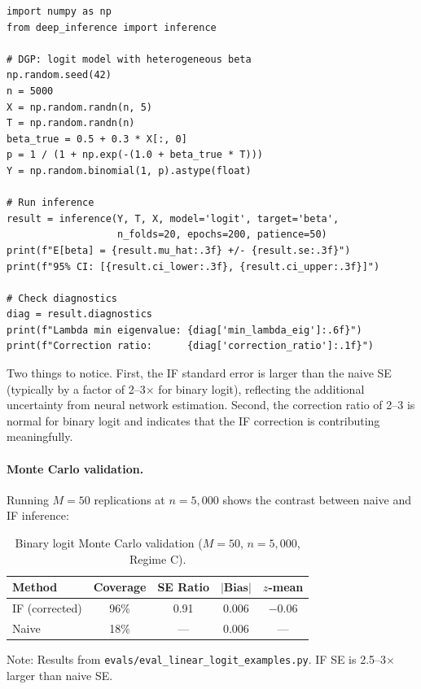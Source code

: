 \begin{lstlisting}
import numpy as np
from deep_inference import inference

# DGP: logit model with heterogeneous beta
np.random.seed(42)
n = 5000
X = np.random.randn(n, 5)
T = np.random.randn(n)
beta_true = 0.5 + 0.3 * X[:, 0]
p = 1 / (1 + np.exp(-(1.0 + beta_true * T)))
Y = np.random.binomial(1, p).astype(float)

# Run inference
result = inference(Y, T, X, model='logit', target='beta',
                   n_folds=20, epochs=200, patience=50)
print(f"E[beta] = {result.mu_hat:.3f} +/- {result.se:.3f}")
print(f"95% CI: [{result.ci_lower:.3f}, {result.ci_upper:.3f}]")

# Check diagnostics
diag = result.diagnostics
print(f"Lambda min eigenvalue: {diag['min_lambda_eig']:.6f}")
print(f"Correction ratio:      {diag['correction_ratio']:.1f}")
\end{lstlisting}

Two things to notice. First, the IF standard error is larger than the naive SE (typically by a factor of 2--3$\times$ for binary logit), reflecting the additional uncertainty from neural network estimation. Second, the correction ratio of 2--3 is normal for binary logit and indicates that the IF correction is contributing meaningfully.

\paragraph{Monte Carlo validation.} Running $M = 50$ replications at $n = 5{,}000$ shows the contrast between naive and IF inference:

\begin{table}[ht]
\centering
\caption{Binary logit Monte Carlo validation ($M=50$, $n=5{,}000$, Regime C).}\label{tab:logit_mc}
\begin{tabular}{lcccc}
\toprule
\textbf{Method} & \textbf{Coverage} & \textbf{SE Ratio} & $|\textbf{Bias}|$ & $z$-\textbf{mean} \\
\midrule
IF (corrected)  & 96\%  & 0.91 & 0.006 & $-0.06$ \\
Naive           & 18\%  & ---  & 0.006 & --- \\
\bottomrule
\end{tabular}
\begin{tablenotes}\small
\item Note: Results from \texttt{evals/eval\_linear\_logit\_examples.py}. IF SE is 2.5--3$\times$ larger than naive SE.
\end{tablenotes}
\end{table}

